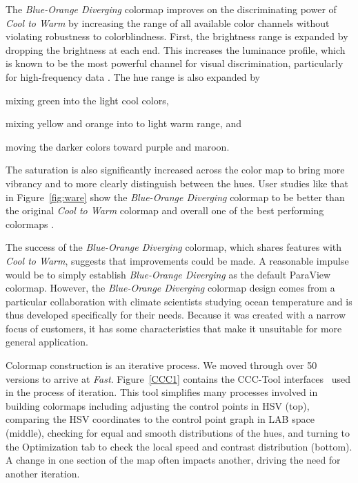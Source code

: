 \documentclass{IEEEcsmag}
\newcommand*{\colormap}[1]{\textsl{#1}\xspace}
\newcommand*{\coolwarm}{\colormap{Cool to Warm}}
\newcommand*{\blueorange}{\colormap{Blue-Orange Diverging}}
\newcommand*{\fast}{\colormap{Fast}}
\begin{document}
The \blueorange colormap improves on the discriminating power of \coolwarm by increasing the range of all available color channels without violating robustness to colorblindness.
First, the brightness range is expanded by dropping the brightness at each end.
This increases the luminance profile, which is known to be the most powerful channel for visual discrimination, particularly for high-frequency data \cite{Ware2019}.
The hue range is also expanded by
\begin{inparaenum}[(1)]
\item mixing green into the light cool colors,
\item mixing yellow and orange into to light warm range, and
\item moving the darker colors toward purple and maroon.
\end{inparaenum}
The saturation is also significantly increased across the color map to bring more vibrancy and to more clearly distinguish between the hues.
User studies like that in Figure~\ref{fig:ware}
show the \blueorange colormap to be better than the original \coolwarm colormap and overall one of the best performing colormaps \cite{Ware2017,Ware2019,Turton2017}.



The success of the \blueorange colormap, which shares features with \coolwarm, suggests that improvements could be made.
A reasonable impulse would be to simply establish \blueorange as the default ParaView colormap.
However, the \blueorange colormap design comes from a particular collaboration with climate scientists studying ocean temperature and is thus developed specifically for their needs.
Because it was created with a narrow focus of customers, it has some characteristics that make it unsuitable for more general application.


Colormap construction is an iterative process.
We moved through over 50 versions to arrive at \fast.
Figure~\ref{CCC1} contains the CCC-Tool interfaces~\cite{Nardini2021} used in the process of iteration.
This tool simplifies many processes involved in building colormaps including adjusting the control points in HSV (top), comparing the HSV coordinates to the control point graph in LAB space (middle), checking for equal and smooth distributions of the hues, and turning to the Optimization tab to check the local speed and contrast distribution (bottom).
A change in one section of the map often impacts another, driving the need for another iteration.
\end{document}
